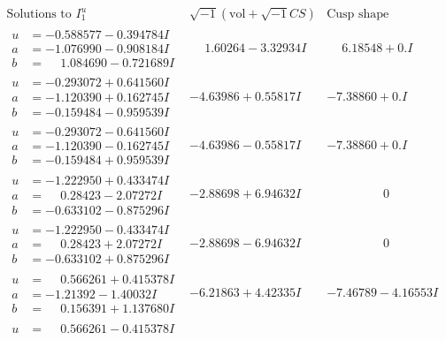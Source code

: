 \documentclass[1p]{elsarticle_modified}
\theoremstyle{definition}
\newcommand{\I}{\sqrt{-1}}
\begin{document}
$$\begin{array}{c|c|c}
\text{Solutions to }I^u_{1}& \I (\text{vol} + \sqrt{-1}CS) & \text{Cusp shape}\\
 \hline 
\begin{aligned}
u &= -0.588577 - 0.394784 I \\
a &= -1.076990 - 0.908184 I \\
b &= \phantom{-}1.084690 - 0.721689 I\end{aligned}
 & \phantom{-}1.60264 - 3.32934 I & \phantom{-}6.18548 + 0. I\phantom{ +0.000000I} \\ \hline\begin{aligned}
u &= -0.293072 + 0.641560 I \\
a &= -1.120390 + 0.162745 I \\
b &= -0.159484 - 0.959539 I\end{aligned}
 & -4.63986 + 0.55817 I & -7.38860 + 0. I\phantom{ +0.000000I} \\ \hline\begin{aligned}
u &= -0.293072 - 0.641560 I \\
a &= -1.120390 - 0.162745 I \\
b &= -0.159484 + 0.959539 I\end{aligned}
 & -4.63986 - 0.55817 I & -7.38860 + 0. I\phantom{ +0.000000I} \\ \hline\begin{aligned}
u &= -1.222950 + 0.433474 I \\
a &= \phantom{-}0.28423 - 2.07272 I \\
b &= -0.633102 - 0.875296 I\end{aligned}
 & -2.88698 + 6.94632 I & \phantom{-0.000000 } 0 \\ \hline\begin{aligned}
u &= -1.222950 - 0.433474 I \\
a &= \phantom{-}0.28423 + 2.07272 I \\
b &= -0.633102 + 0.875296 I\end{aligned}
 & -2.88698 - 6.94632 I & \phantom{-0.000000 } 0 \\ \hline\begin{aligned}
u &= \phantom{-}0.566261 + 0.415378 I \\
a &= -1.21392 - 1.40032 I \\
b &= \phantom{-}0.156391 + 1.137680 I\end{aligned}
 & -6.21863 + 4.42335 I & -7.46789 - 4.16553 I \\ \hline\begin{aligned}
u &= \phantom{-}0.566261 - 0.415378 I \\

\end{aligned}
\end{array}$$
\end{document}
